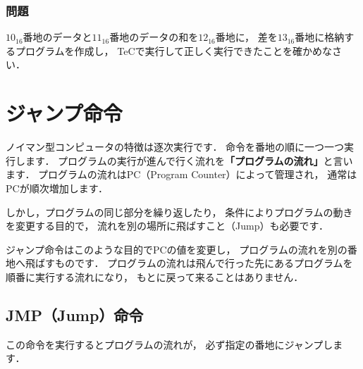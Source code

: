 \vfill
\subsubsection{問題}
$10_{16}$番地のデータと$11_{16}$番地のデータの和を$12_{16}$番地に，
差を$13_{16}$番地に格納するプログラムを作成し，
TeCで実行して正しく実行できたことを確かめなさい．
\vfill

\newpage
\section{ジャンプ命令}
ノイマン型コンピュータの特徴は逐次実行です．
命令を番地の順に一つ一つ実行します．
プログラムの実行が進んで行く流れを{\bf 「プログラムの流れ」}と言います．
プログラムの流れはPC（Program Counter）によって管理され，
通常はPCが順次増加します．

しかし，プログラムの同じ部分を繰り返したり，
条件によりプログラムの動きを変更する目的で，
流れを別の場所に飛ばすこと（Jump）も必要です．

ジャンプ命令はこのような目的でPCの値を変更し，
プログラムの流れを別の番地へ飛ばすものです．
プログラムの流れは飛んで行った先にあるプログラムを順番に実行する流れになり，
もとに戻って来ることはありません．

\subsection{JMP（Jump）命令}
この命令を実行するとプログラムの流れが，
必ず指定の番地にジャンプします．

